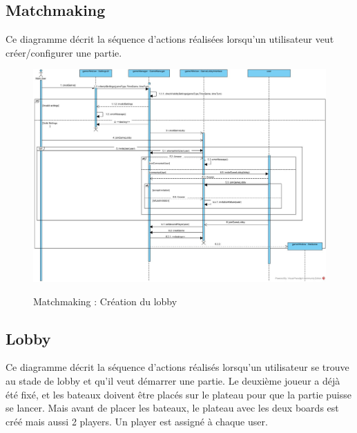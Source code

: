 \documentclass[../design_fonctionnement_sys.tex]{subfiles}
\begin{document}
\newpage

\subsection{Matchmaking}
Ce diagramme décrit la séquence d'actions réalisées lorsqu'un utilisateur veut créer/configurer une partie.

\begin{figure}[H]
    \centering
    \includegraphics[scale=0.3]{img_design/PreLoby.jpg}
    \label{fig:seq_match_client}
    \caption{Matchmaking : Création du lobby}
\end{figure}

\newpage

\subsection{Lobby}
Ce diagramme décrit la séquence d'actions réalisés lorsqu'un utilisateur se trouve au stade de lobby et qu'il veut démarrer une partie.
Le deuxième joueur a déjà été fixé, et les bateaux doivent être placés sur le plateau pour que la partie puisse se lancer.
Mais avant de placer les bateaux, le plateau avec les deux boards est créé mais aussi 2 players. Un player est assigné à chaque user.
\end{document}
